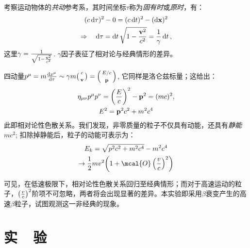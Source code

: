 \documentclass{buaaemp}
\begin{document}
	考察运动物体的\textit{共动}参考系，其时间坐标$\tau$称为\textit{固有时}或\textit{原时}，有：
	\begin{equation}
	\begin{gathered}
		(c\dd{\tau})^2 - 0 = (c\dd{t})^2 - (\dd{\vb{x}})^2 \\
		\Rightarrow\quad
		\dd{\tau} = \dd{t} \sqrt{1 - \frac{\vb{v}^2}{c^2}}
		= \frac{1}{\gamma}\dd{t},\\
	\end{gathered}
	\end{equation}
	这里$\gamma = \frac{1}{\sqrt{1 - \frac{\vb{v}^2}{c^2}}}$. $\gamma$因子表征了相对论与经典情形的差异。
	
	四动量$p^\mu = m\dv{x^\mu}{\tau} \sim \gamma m
		\pqty{\begin{smallmatrix}
			c \\[1ex] \vb{v}
		\end{smallmatrix}}
		=
		\pqty{\begin{smallmatrix}
			E/c \\[1ex] \vb{p}
		\end{smallmatrix}}$, 它同样是洛仑兹标量；这给出：
	\begin{equation}
	\begin{gathered}
		\eta_{\mu\nu} p^\mu p^\nu
		= \pqty{\frac{E}{c}}^2 - \vb{p}^2 = (mc)^2,\\
		E^2 = \vb{p}^2 c^2 + m^2 c^4
		\label{eq:E-Prelations}
	\end{gathered}
	\end{equation}
	此即相对论性色散关系。我们发现，非零质量的粒子不仅具有动能，还具有\textit{静能}$mc^2$; 扣除掉静能后，粒子的动能可表示为：
	\begin{equation}
        \begin{gathered}
            E_k = \sqrt{p^2 c^2 + m^2 c^4} - m^2 c^4 \\ 
        \to \frac{1}{2} mv^2 
        \pqty{1 + \mcal{O}\,\pqty{\frac{v}{c}}^2}
        \label{eq:relativityEk}
        \end{gathered}
	\end{equation}
	
	可见，在低速极限下，相对论性色散关系回归至经典情形；而对于高速运动的粒子，$\pqty{\frac{v}{c}}^2$阶项不可忽略，两者将会出现显著的差异。本实验即采用$\beta$衰变产生的高速$\beta$粒子，试图观测这一非经典的现象。
 
\section{实~~验}
\end{document}
